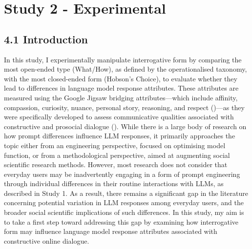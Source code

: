 \documentclass[
  12pt,
]{article}
\begin{document}
\section{Study 2 - Experimental}\label{study-2---experimental}

\subsection{4.1 Introduction}\label{introduction-2}

In this study, I experimentally manipulate interrogative form by comparing the most open-ended type (What/How), as defined by the operationalised taxonomy, with the most closed-ended form (Hobson's Choice), to evaluate whether they lead to differences in language model response attributes. These attributes are measured using the Google Jigsaw bridging attributes---which include affinity, compassion, curiosity, nuance, personal story, reasoning, and respect ()---as they were specifically developed to assess communicative qualities associated with constructive and prosocial dialogue (). While there is a large body of research on how prompt differences influence LLM responses, it primarily approaches the topic either from an engineering perspective, focused on optimising model function, or from a methodological perspective, aimed at augmenting social scientific research methods. However, most research does not consider that everyday users may be inadvertently engaging in a form of prompt engineering through individual differences in their routine interactions with LLMs, as described in Study 1. As a result, there remains a significant gap in the literature concerning potential variation in LLM responses among everyday users, and the broader social scientific implications of such differences. In this study, my aim is to take a first step toward addressing this gap by examining how interrogative form may influence language model response attributes associated with constructive online dialogue.
\end{document}
